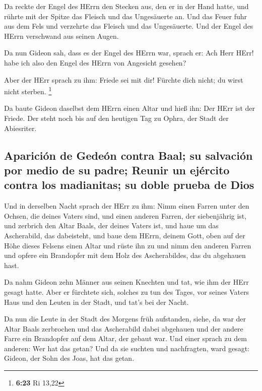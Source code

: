  Da reckte der Engel des HErrn den Stecken aus, den er in
der Hand hatte, und rührte mit der Spitze das Fleisch und das
Ungesäuerte an. Und das Feuer fuhr aus dem Fels und verzehrte das
Fleisch und das Ungesäuerte. Und der Engel des HErrn verschwand aus
seinen Augen.

 Da nun Gideon sah, dass es der Engel des HErrn war,
sprach er: Ach Herr HErr! habe ich also den Engel des HErrn von
Angesicht gesehen?

 Aber der HErr sprach zu ihm: Friede sei mit dir! Fürchte
dich nicht; du wirst nicht sterben. \footnote{\textbf{6:23} Ri 13,22}

 Da baute Gideon daselbst dem HErrn einen Altar und hieß
ihn: Der HErr ist der Friede. Der steht noch bis auf den heutigen Tag zu
Ophra, der Stadt der Abiesriter.

\hypertarget{apariciuxf3n-de-gedeuxf3n-contra-baal-su-salvaciuxf3n-por-medio-de-su-padre-reunir-un-ejuxe9rcito-contra-los-madianitas-su-doble-prueba-de-dios}{%
\subsection{Aparición de Gedeón contra Baal; su salvación por medio de
su padre; Reunir un ejército contra los madianitas; su doble prueba de
Dios}\label{apariciuxf3n-de-gedeuxf3n-contra-baal-su-salvaciuxf3n-por-medio-de-su-padre-reunir-un-ejuxe9rcito-contra-los-madianitas-su-doble-prueba-de-dios}}

 Und in derselben Nacht sprach der HErr zu ihm: Nimm
einen Farren unter den Ochsen, die deines Vaters sind, und einen anderen
Farren, der siebenjährig ist, und zerbrich den Altar Baals, der deines
Vaters ist, und haue um das Ascherabild, das dabeisteht, 
und baue dem HErrn, deinem Gott, oben auf der Höhe dieses Felsens einen
Altar und rüste ihn zu und nimm den anderen Farren und opfere ein
Brandopfer mit dem Holz des Ascherabildes, das du abgehauen hast.

 Da nahm Gideon zehn Männer aus seinen Knechten und tat,
wie ihm der HErr gesagt hatte. Aber er fürchtete sich, solches zu tun
des Tages, vor seines Vaters Haus und den Leuten in der Stadt, und tat's
bei der Nacht.

 Da nun die Leute in der Stadt des Morgens früh
aufstanden, siehe, da war der Altar Baals zerbrochen und das Ascherabild
dabei abgehauen und der andere Farre ein Brandopfer auf dem Altar, der
gebaut war.  Und einer sprach zu dem anderen: Wer hat das
getan? Und da sie suchten und nachfragten, ward gesagt: Gideon, der Sohn
des Joas, hat das getan.

